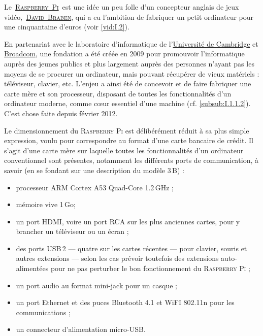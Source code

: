 Le \href{https://fr.wikipedia.org/wiki/Raspberry_Pi}{\textsc{Raspberry Pi}} est une idée un peu folle d'un concepteur anglais de jeux vidéo, \href{https://en.wikipedia.org/wiki/David_Braben}{\textsc{David Braben}}, qui a eu l'ambition de fabriquer un petit ordinateur pour une cinquantaine d'euros (voir \cref{vid:I.2}).

En partenariat avec le laboratoire d'informatique de l'\href{https://www.cam.ac.uk/}{Université de Cambridge} et \href{https://www.broadcom.com/}{Broadcom}, une fondation a été créée en 2009 pour promouvoir l'informatique auprès des jeunes publics et plus largement auprès des personnes n'ayant pas les moyens de se procurer un ordinateur, mais pouvant récupérer de vieux matériels : téléviseur, clavier, etc. L'enjeu a ainsi été de concevoir et de faire fabriquer une carte mère et son processeur, disposant de toutes les fonctionnalités d'un ordinateur moderne, comme cœur essentiel d'une machine (cf. \cref{subsub:I.1.1.2}). C'est chose faite depuis février 2012.

Le dimensionnement du \textsc{Raspberry Pi} est délibérément réduit à sa plus simple expression, voulu pour correspondre au format d'une carte bancaire de crédit. Il s'agit d'une carte mère sur laquelle toutes les fonctionnalités d'un ordinateur conventionnel sont présentes, notamment les différents ports de communication, à savoir (en se fondant sur une description du modèle 3\,B) :
\setlength{\columnsep}{-10pt}
\begin{multicols}{2}
\begin{itemize}\jazzitem
\item processeur ARM Cortex A53 Quad-Core 1.2\,GHz ;
\item mémoire vive 1\,Go;
\item un port HDMI, voire un port RCA sur les plus anciennes cartes, pour y brancher un téléviseur ou un écran ;
\item des ports USB\,2 --- quatre sur les cartes récentes --- pour clavier, souris et autres extensions --- selon les cas prévoir toutefois des extensions auto-alimentées pour ne pas perturber le bon fonctionnement du \textsc{Raspberry Pi} ;
\item un port audio au format mini-jack pour un casque ;
\item un port Ethernet et des puces Bluetooth 4.1 et WiFI 802.11n pour les communications ;
\item un connecteur d'alimentation micro-USB.
\end{itemize}
\end{multicols}

